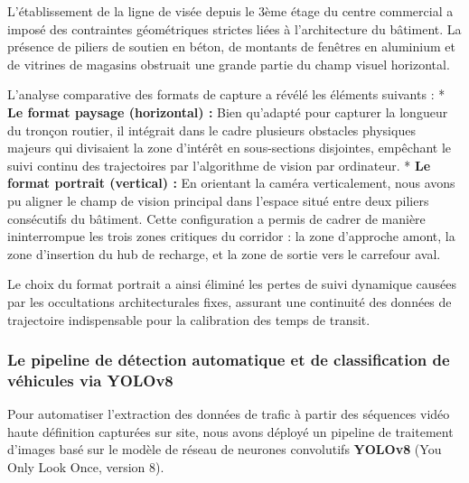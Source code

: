 \documentclass[10pt, a4paper]{article}
\begin{document}
L'établissement de la ligne de visée depuis le 3ème étage du centre
commercial a imposé des contraintes géométriques strictes liées à
l'architecture du bâtiment. La présence de piliers de soutien en béton,
de montants de fenêtres en aluminium et de vitrines de magasins
obstruait une grande partie du champ visuel horizontal.

L'analyse comparative des formats de capture a révélé les éléments
suivants : * \textbf{Le format paysage (horizontal) :} Bien qu'adapté
pour capturer la longueur du tronçon routier, il intégrait dans le cadre
plusieurs obstacles physiques majeurs qui divisaient la zone d'intérêt
en sous-sections disjointes, empêchant le suivi continu des trajectoires
par l'algorithme de vision par ordinateur. * \textbf{Le format portrait
(vertical) :} En orientant la caméra verticalement, nous avons pu
aligner le champ de vision principal dans l'espace situé entre deux
piliers consécutifs du bâtiment. Cette configuration a permis de cadrer
de manière ininterrompue les trois zones critiques du corridor : la zone
d'approche amont, la zone d'insertion du hub de recharge, et la zone de
sortie vers le carrefour aval.

Le choix du format portrait a ainsi éliminé les pertes de suivi
dynamique causées par les occultations architecturales fixes, assurant
une continuité des données de trajectoire indispensable pour la
calibration des temps de transit.

\subsubsection{Le pipeline de détection automatique et de classification
de véhicules via
YOLOv8}\label{le-pipeline-de-duxe9tection-automatique-et-de-classification-de-vuxe9hicules-via-yolov8}

Pour automatiser l'extraction des données de trafic à partir des
séquences vidéo haute définition capturées sur site, nous avons déployé
un pipeline de traitement d'images basé sur le modèle de réseau de
neurones convolutifs \textbf{YOLOv8} (You Only Look Once, version 8).
\end{document}
